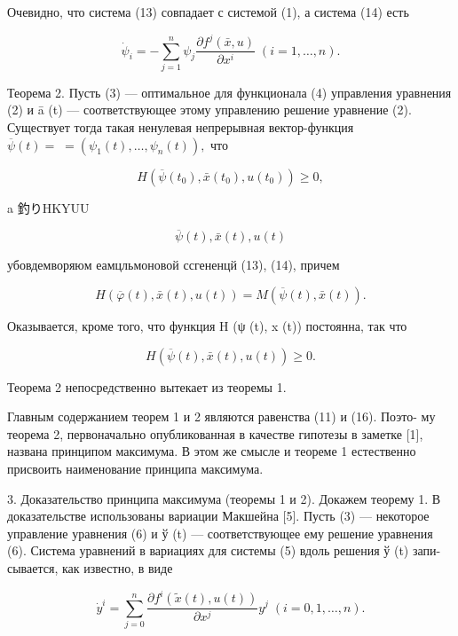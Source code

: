 \documentclass[10pt]{article}
\begin{document}
Очевидно, что система (13) совпадает с системой (1), а система (14) есть

\[
{\dot{\psi }}_{i} =  - \mathop{\sum }\limits_{{j = 1}}^{n}{\psi }_{j}\frac{\partial {f}^{j}\left( {\bar{x},u}\right) }{\partial {x}^{i}}\;\left( {i = 1,\ldots,n}\right). \tag{15}
\]

Теорема 2. Пусть (3) — оптимальное для функционала (4) управления уравнения (2) и ā (t) — соответствующее этому управлению решение уравнение (2). Существует тогда такая ненулевая непрерывная вектор-функция \(\overline{\psi }\left( t\right)  = \; = \left( {{\psi }_{1}\left( t\right),\ldots,{\psi }_{n}\left( t\right) }\right),\) что

\[
H\left( {\overline{\psi }\left( {t}_{0}\right),\bar{x}\left( {t}_{0}\right),u\left( {t}_{0}\right) }\right)  \geq  0,
\]

a 釣りHKYUU

\[
\overline{\psi }\left( t\right),\bar{x}\left( t\right),u\left( t\right)
\]

убовдемворяюм еамцльмоновой ссгененцй (13), (14), причем

\[
H\left( {\overline{\varphi }\left( t\right),\bar{x}\left( t\right),u\left( t\right) }\right)  = M\left( {\overline{\psi }\left( t\right),\bar{x}\left( t\right) }\right). \tag{16}
\]

Оказывается, кроме того, что функция H (ψ (t), x (t)) постоянна, так что

\[
H\left( {\overline{\psi }\left( t\right),\bar{x}\left( t\right),u\left( t\right) }\right)  \geq  0. \tag{17}
\]

Теорема 2 непосредственно вытекает из теоремы 1.

Главным содержанием теорем 1 и 2 являются равенства (11) и (16). Поэто- му теорема 2, первоначально опубликованная в качестве гипотезы в заметке [1], названа принципом максимума. В этом же смысле и теореме 1 естественно присвоить наименование принципа максимума.

3. Доказательство принципа максимума (теоремы 1 и 2). Докажем теорему 1. В доказательстве использованы вариации Макшейна [5]. Пусть (3) — некоторое управление уравнения (6) и ў (t) — соответствующее ему решение уравнения (6). Система уравнений в вариациях для системы (5) вдоль решения ў (t) запи- сывается, как известно, в виде

\[
{\dot{y}}^{i} = \mathop{\sum }\limits_{{j = 0}}^{n}\frac{\partial {f}^{i}\left( {\widetilde{x}\left( t\right),u\left( t\right) }\right) }{\partial {x}^{j}}{y}^{j}\;\left( {i = 0,1,\ldots,n}\right). \tag{18}
\]
\end{document}
